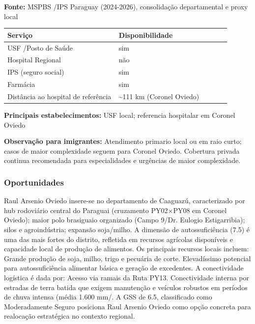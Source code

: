 \textbf{Fonte:} MSPBS /\allowbreak  IPS Paraguay (2024-2026), consolidação
departamental e proxy local

{\def\LTcaptype{none} %
\begin{longtable}{@{}>{\raggedright\arraybackslash}p{0.45\linewidth} >{\raggedright\arraybackslash}p{0.45\linewidth}@{}}
\toprule\noalign{}
Serviço & Disponibilidade \\
\midrule\noalign{}
\endhead
\bottomrule\noalign{}
\endlastfoot
USF /\allowbreak  Posto de Saúde & sim \\
Hospital Regional & não \\
IPS (seguro social) & sim \\
Farmácia & sim \\
Distância ao hospital de referência & \textasciitilde111 km (Coronel
Oviedo) \\
\end{longtable}
}

\textbf{Principais estabelecimentos:} USF local; referencia hospitalar
em Coronel Oviedo

\textbf{Observação para imigrantes:} Atendimento primario local ou em
raio curto; casos de maior complexidade seguem para Coronel Oviedo.
Cobertura privada continua recomendada para especialidades e urgências
de maior complexidade.
\newpage

\subsubsection*{Oportunidades}\label{oport-raul-arsenio-oviedo-0514}
Raul Arsenio Oviedo insere-se no departamento de Caaguazú, caracterizado por hub rodoviário central do Paraguai (cruzamento PY02×PY08 em Coronel Oviedo); maior polo brasiguaio organizado (Campo 9/Dr. Eulogio Estigarribia); silos e agroindústria; expansão soja/milho. A dimensão de autossuficiência (7.5) é uma das mais fortes do distrito, refletida em recursos agrícolas disponíveis e capacidade local de produção de alimentos. Os principais recursos locais incluem: Grande produção de soja, milho, trigo e pecuária de corte. Elevadíssimo potencial para autossuficiência alimentar básica e geração de excedentes. A conectividade logística é dada por: Acesso via ramais da Ruta PY13. Conectividade interna por estradas de terra batida que exigem manutenção e veículos robustos em períodos de chuva intensa (média 1.600 mm/. A GSS de 6.5, classificado como Moderadamente Seguro posiciona Raul Arsenio Oviedo como opção concreta para realocação estratégica no contexto regional.

